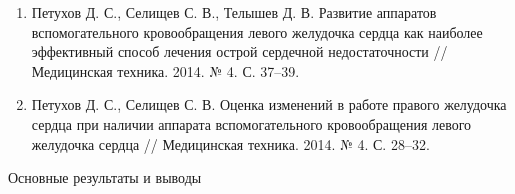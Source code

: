 \documentclass[a4paper, 9pt]{beamer}
\begin{document}
\begin{frame}
\begin{enumerate}
  \item Петухов Д. С., Селищев С. В., Телышев Д. В. Развитие аппаратов вспомогательного кровообращения левого желудочка сердца как наиболее эффективный способ лечения острой сердечной недостаточности // Медицинская техника. 2014. № 4. С. 37--39.
  \item Петухов Д. С., Селищев С. В. Оценка изменений в работе правого желудочка сердца при наличии аппарата вспомогательного кровообращения левого желудочка сердца // Медицинская техника. 2014. № 4. С. 28--32.
\end{enumerate}

\end{frame}


\begin{frame}{Основные результаты и выводы}
\scriptsize


\end{frame}
\end{document}
